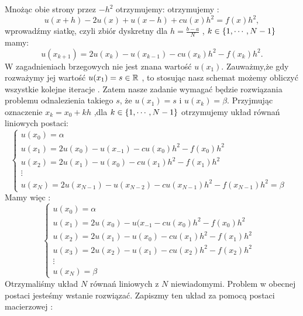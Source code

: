 \documentclass[12pt,a4paper]{report}
\begin{document}
Mnożąc obie strony przez $-h^2$ otrzymujemy:  otrzymujemy :
\begin{equation}
u(x+h) - 2u(x) + u(x-h) + cu(x)h^2 = f(x)h^2,
\end{equation}
wprowadźmy siatkę, czyli zbiór dyskretny dla $ h= \frac{b-a}{N}$ , $k \in \left\lbrace {1,\cdots,N-1} \right\rbrace$  mamy: 
\begin{equation} \label{boundary_model}
u(x_{k+1}) = 2u(x_k) - u(x_{k-1}) - cu(x_k)h^2 - f(x_k)h^2.
\end{equation}
W zagadnieniach brzegowych nie jest znana wartość $u(x_1)$. Zauważmy,że gdy rozważymy jej wartość $u(x_1) = s \in \mathbb{R}$ , to stosując nasz schemat możemy obliczyć wszystkie kolejne iteracje . Zatem nasze zadanie wymagać będzie rozwiązania problemu odnalezienia takiego $s$, że $u(x_1) = s$ i $u(x_k) = \beta$. Przyjmując oznaczenie $ x_k = x_0 + kh$ ,dla $ k \in \left\lbrace {1, \cdots,N-1} \right\rbrace $ otrzymujemy układ równań liniowych postaci:
\begin{equation}
\left\{ \begin{array}{ll}
u(x_0) = \alpha & \\
u(x_1) = 2u(x_0) - u(x_{-1}) - cu(x_0)h^2 - f(x_0)h^2 & \\
u(x_2) = 2u(x_1) - u(x_{0}) - cu(x_1)h^2 - f(x_1)h^2 & \\ 
\vdots  & \\
u(x_{N}) = 2u(x_{N-1}) - u(x_{N-2}) - cu(x_{N-1})h^2 - f(x_{N-1})h^2 = \beta & 
\end{array} \right.
\end{equation}
Mamy więc  :
\begin{equation}
\left\{ \begin{array}{ll}
u(x_0) = \alpha & \\
u(x_1) = 2u(x_0) - u(x_{-1} - cu(x_0)h^2 - f(x_0)h^2 & \\
u(x_2) = 2u(x_1) - u(x_{0}) - cu(x_1)h^2 - f(x_1)h^2 & \\ 
u(x_3) = 2u(x_2) - u(x_{1}) - cu(x_2)h^2 - f(x_2)h^2 & \\
\vdots & \\
u(x_N) = \beta  
\end{array} \right.
\end{equation}
Otrzymaliśmy układ $N$ równań liniowych z $N$ niewiadomymi. Problem w obecnej postaci jesteśmy wstanie rozwiązać. Zapiszmy ten układ za pomocą postaci macierzowej :
\end{document}
